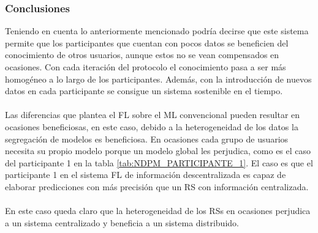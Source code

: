\subsubsection{Conclusiones}
Teniendo en cuenta lo anteriormente mencionado podría decirse que este sistema permite que los participantes que cuentan con pocos datos se beneficien del conocimiento de otros usuarios, aunque estos no se vean compensados en ocasiones. Con cada iteración del protocolo el conocimiento pasa a ser más homogéneo a lo largo de los participantes. Además, con la introducción de nuevos datos en cada participante se consigue un sistema sostenible en el tiempo.
\\ \\
Las diferencias que plantea el FL sobre el ML convencional pueden resultar en ocasiones beneficiosas, en este caso, debido a la heterogeneidad de los datos la segregación de modelos es beneficiosa. En ocasiones cada grupo de usuarios necesita su propio modelo porque un modelo global les perjudica, como es el caso del participante 1 en la tabla \ref{tab:NDPM_PARTICIPANTE_1}. El caso es que el participante 1 en el sistema FL de información descentralizada es capaz de elaborar predicciones con más precisión que un RS con información centralizada.
\\ \\
En este caso queda claro que la heterogeneidad de los RSs en ocasiones perjudica a un sistema centralizado y beneficia a un sistema distribuido. 